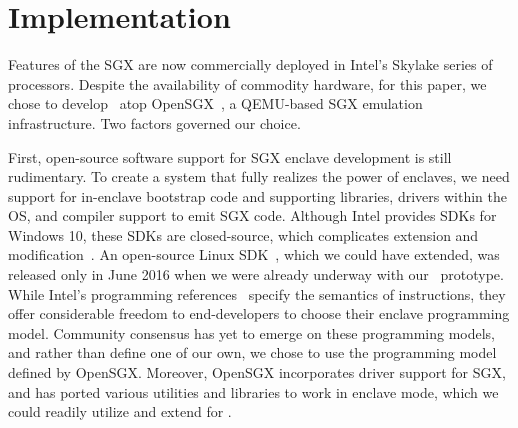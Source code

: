 \section{Implementation}
\label{section:implementation}




Features of the SGX are now commercially deployed in Intel's Skylake series of
processors. Despite the availability of commodity hardware, for this paper, we
chose to develop \tool\ atop OpenSGX~\cite{opensgx:ndss16}, a QEMU-based SGX
emulation infrastructure. Two factors governed our choice.

First, open-source software support for SGX enclave development is still
rudimentary. To create a system that fully realizes the power of enclaves, we
need support for in-enclave bootstrap code and supporting libraries, drivers
within the OS, and compiler support to emit SGX code. Although Intel provides
SDKs for Windows 10, these SDKs are closed-source, which complicates extension
and modification~\cite{win10:sdk}. An open-source Linux
SDK~\cite{linuxsdk:june16}, which we could have extended, was released only in
June 2016 when we were already underway with our \tool\ prototype.  While
Intel's programming references~\cite{intelsgx:sep13,intelsgx:oct14} specify the
semantics of instructions, they offer considerable freedom to end-developers to
choose their enclave programming model. Community consensus has yet to emerge
on these programming models, and rather than define one of our own, we chose to
use the programming model defined by OpenSGX. Moreover, OpenSGX incorporates
driver support for SGX, and has ported various utilities and libraries to work
in enclave mode, which we could readily utilize and extend for \tool.

